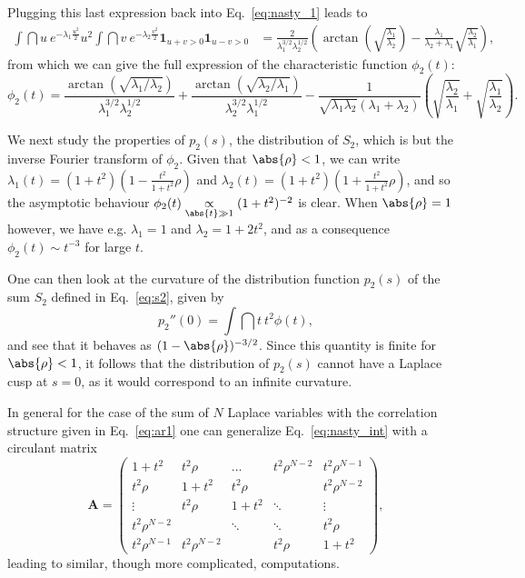 Plugging this last expression back into Eq.~\eqref{eq:nasty_1} leads to
\begin{equation}\label{eq:nasty_1_complete}
\begin{split}
\int \dint u~e^{-\lambda_1 \frac{u^2}{2}}u^2 \int\dint v~ e^{-\lambda_2 \frac{v^2 }{2}}\mathbf{1}_{u+v>0}\mathbf{1}_{u-v>0}  &= \frac{2}{\lambda_1^{3/2}\lambda_2^{1/2}}\left(\arctan\left(\sqrt{\frac{\lambda_1}{\lambda_2}}\right)- \frac{\lambda_1}{\lambda_2+\lambda_1}\sqrt{\frac{\lambda_2}{\lambda_1}}\right),
\end{split}
\end{equation}
from which we can give the full expression of the characteristic function $\phi_2(t)$:
\begin{equation}\label{eq:nasty_2}
\phi_2(t)=\frac{\arctan(\sqrt{\lambda_1/\lambda_2})}{\lambda_1^{3/2}\lambda_2^{1/2}}+\frac{\arctan(\sqrt{\lambda_2/\lambda_1})}{\lambda_2^{3/2}\lambda_1^{1/2}}-\frac{1}{\sqrt{\lambda_1\lambda_2}\left(\lambda_1+\lambda_2\right)}\left(\sqrt{\frac{\lambda_2}{\lambda_1}}+\sqrt{\frac{\lambda_1}{\lambda_2}}\right).
\end{equation}


We next study the properties of $p_2(s)$, the distribution of $S_2$, which is but the inverse Fourier transform of $\phi_2$. 
Given that $\abs{\rho}<1$, we can write $\lambda_1(t) = \left(1+t^2\right)\left(1-\frac{t^2}{1+t^2}\rho\right)$ and $\lambda_2(t)=\left(1+t^2\right)\left(1+\frac{t^2}{1+t^2}\rho\right)$, and so the asymptotic behaviour $\phi_2(t)\underset{\abs{t}\gg 1}{\propto}(1+t^2)^{-2}$ is clear. When $\abs{\rho}=1$ however, we have e.g. $\lambda_1=1$ and $\lambda_2 = 1+2t^2$, and as a consequence $\phi_2(t)\sim t^{-3}$ for large $t$.

One can then look at the curvature of the distribution function $p_2(s)$ of the sum $S_2$ defined in Eq.~\eqref{eq:s2}, given by
\begin{equation}
    p_2''(0) = \int \dint t~t^2 \phi(t),
\end{equation}
and see that it behaves as $(1-\abs{\rho})^{-3/2}$. Since this quantity is finite for $\abs{\rho}<1$, it follows that the distribution of $p_2(s)$ cannot have a Laplace cusp at $s=0$, as it would correspond to an infinite curvature.


In general for the case of the sum of $N$ Laplace variables with the correlation structure given in Eq.~\eqref{eq:ar1} one can generalize Eq.~\eqref{eq:nasty_int} with a circulant matrix
\begin{equation}\label{eq:a_matrix}
\mathbf{A} = \left( \begin{matrix}
1+t^2& t^2\rho& \ldots &t^2\rho^{N-2} &t^2\rho^{N-1}\\
t^2\rho& 1+t^2& t^2\rho& &t^2\rho^{N-2}\\
\vdots& t^2\rho& 1+t^2& \ddots& \vdots\\
t^2\rho^{N-2}& & \ddots& \ddots& t^2\rho \\
t^2\rho^{N-1}& t^2\rho^{N-2}& & t^2\rho & 1+t^2
\end{matrix} \right),
\end{equation}
leading to similar, though more complicated, computations.